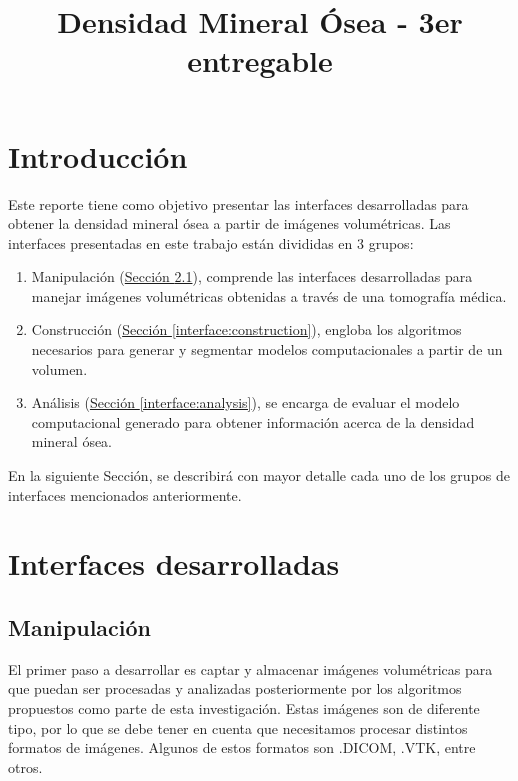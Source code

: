 \documentclass{article}
\title{\textbf{Densidad Mineral Ósea - 3er entregable}}
\date{}
\author{ }
\newcommand*{\midsec}[1]{\hyperref[{#1}]{Sección \ref{#1}}}
\begin{document}
\maketitle

\section{Introducción}

Este reporte tiene como objetivo presentar las interfaces desarrolladas para obtener la densidad mineral ósea a partir de imágenes volumétricas. Las interfaces presentadas en este trabajo están divididas en 3 grupos:

\begin{enumerate}
	\item Manipulación (\midsec{interface:handling}), comprende las interfaces desarrolladas para manejar imágenes volumétricas obtenidas a través de una tomografía médica.
	\item Construcción (\midsec{interface:construction}), engloba los algoritmos necesarios para generar y segmentar modelos computacionales a partir de un volumen.
	\item Análisis (\midsec{interface:analysis}), se encarga de evaluar el modelo computacional generado para obtener información acerca de la densidad mineral ósea.
\end{enumerate}

En la siguiente Sección, se describirá con mayor detalle cada uno de los grupos de interfaces mencionados anteriormente.

\section{Interfaces desarrolladas}

\subsection{Manipulación}
\label{interface:handling}

El primer paso a desarrollar es captar y almacenar imágenes volumétricas para que puedan ser procesadas y analizadas posteriormente por los algoritmos propuestos como parte de esta investigación. Estas imágenes son de diferente tipo, por lo que se debe tener en cuenta que necesitamos procesar distintos formatos de imágenes. Algunos de estos formatos son .DICOM, .VTK, entre otros. 
\end{document}
